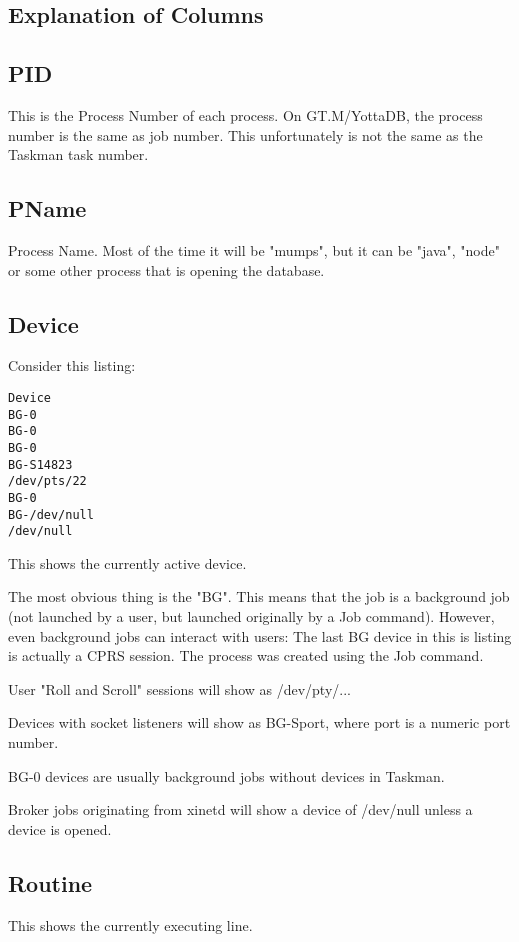 \documentclass[]{article}
\begin{document}
\pagebreak
\begin{multicols}{2}
\section{Explanation of Columns}

\subsection{PID}
This is the Process Number of each process. On GT.M/YottaDB, the process number is the same as job number. This unfortunately is not the same as the Taskman task number.

\subsection{PName}
Process Name. Most of the time it will be "mumps", but it can be "java", "node" or some other process that is opening the database.

\subsection{Device}
Consider this listing:
\lstset{caption=Device}
\begin{lstlisting}
Device
BG-0         
BG-0         
BG-0         
BG-S14823    
/dev/pts/22  
BG-0         
BG-/dev/null
/dev/null
\end{lstlisting}
This shows the currently active device.

The most obvious thing is the "BG". This means that the job is a background job (not launched by a user, but launched originally by a Job command). However, even background jobs can interact with users: The last BG device in this is listing is actually a CPRS session. The process was created using the Job command.

User "Roll and Scroll" sessions will show as /dev/pty/...

Devices with socket listeners will show as BG-Sport, where port is a numeric port number.

BG-0 devices are usually background jobs without devices in Taskman.

Broker jobs originating from xinetd will show a device of /dev/null unless a device is opened.

\subsection{Routine}
This shows the currently executing line.


\end{multicols}
\end{document}
